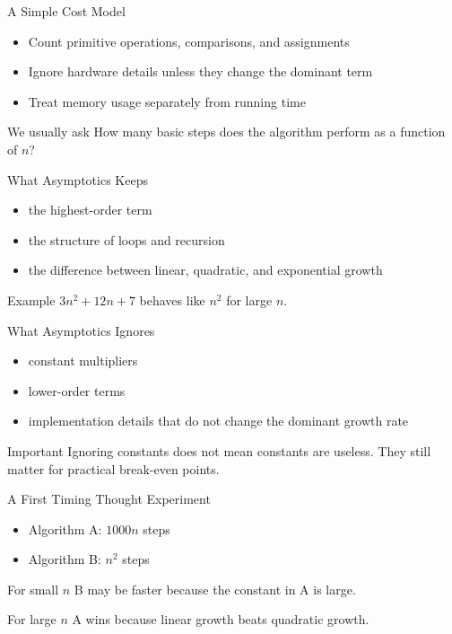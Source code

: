 \documentclass[aspectratio=169,xcolor=dvipsnames]{beamer}
\begin{document}
\begin{frame}{A Simple Cost Model}
  \begin{itemize}
    \item Count primitive operations, comparisons, and assignments
    \item Ignore hardware details unless they change the dominant term
    \item Treat memory usage separately from running time
  \end{itemize}
  \begin{exampleblock}{We usually ask}
    How many basic steps does the algorithm perform as a function of $n$?
  \end{exampleblock}
\end{frame}

\begin{frame}{What Asymptotics Keeps}
  \begin{itemize}
    \item the highest-order term
    \item the structure of loops and recursion
    \item the difference between linear, quadratic, and exponential growth
  \end{itemize}
  \begin{block}{Example}
    $3n^2 + 12n + 7$ behaves like $n^2$ for large $n$.
  \end{block}
\end{frame}

\begin{frame}{What Asymptotics Ignores}
  \begin{itemize}
    \item constant multipliers
    \item lower-order terms
    \item implementation details that do not change the dominant growth rate
  \end{itemize}
  \begin{alertblock}{Important}
    Ignoring constants does not mean constants are useless. They still matter for practical break-even points.
  \end{alertblock}
\end{frame}

\begin{frame}{A First Timing Thought Experiment}
  \begin{itemize}
    \item Algorithm A: $1000n$ steps
    \item Algorithm B: $n^2$ steps
  \end{itemize}
  \begin{block}{For small $n$}
    B may be faster because the constant in A is large.
  \end{block}
  \begin{block}{For large $n$}
    A wins because linear growth beats quadratic growth.
  \end{block}
\end{frame}
\end{document}
